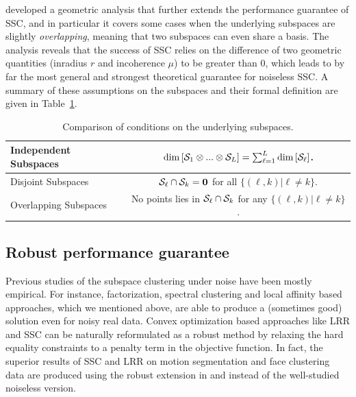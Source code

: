\documentclass[main]{subfiles}
\begin{document}
\cite{soltanolkotabi2011geometric} developed a geometric analysis that further extends the performance guarantee of SSC, and in particular it covers some cases when the underlying subspaces are slightly \emph{overlapping}, meaning that two subspaces can even share a basis. The analysis reveals that the success of SSC relies on the difference of two geometric quantities (inradius $r$ and incoherence $\mu$) to be greater than $0$, which leads to by far the most general and strongest theoretical guarantee for noiseless SSC. A summary of these assumptions on the subspaces and their formal definition are given in Table~\ref{tab:subspaces}.
\begin{table}
  \centering
\begin{tabular}{|l|c|}
  \hline
  Independent Subspaces & $\mathrm{dim}\left[\mathcal{S}_1\otimes...\otimes \mathcal{S}_L\right] = \sum_{\ell=1}^L \mathrm{dim}\left[\mathcal{S}_\ell\right]  $.  \\\hline
  Disjoint Subspaces &  $\mathcal{S}_\ell\cap \mathcal{S}_k =\mathbf{0}$ for all $\{(\ell,k)|\ell\neq k\}$.\\\hline
  Overlapping Subspaces & No points lies in $\mathcal{S}_\ell\cap \mathcal{S}_k$ for any $\{(\ell,k)|\ell\neq k\}$.\\
  \hline
\end{tabular}
\caption{Comparison of conditions on the underlying subspaces.}\label{tab:subspaces}
\end{table}



\subsection{Robust performance guarantee}

Previous studies of the subspace clustering under noise have been mostly empirical. For instance, factorization, spectral clustering and local affinity based approaches, which we mentioned above, are able to produce a (sometimes good) solution even for noisy real data. Convex optimization based approaches like LRR and SSC can be naturally reformulated as a robust method by relaxing the hard equality constraints to a penalty term in the objective function. In fact, the superior results of SSC and LRR on motion segmentation and face clustering data are produced using the robust extension in \cite{elhamifar2009ssc} and \cite{liu2010lrr_icml} instead of the well-studied noiseless version.
\end{document}
